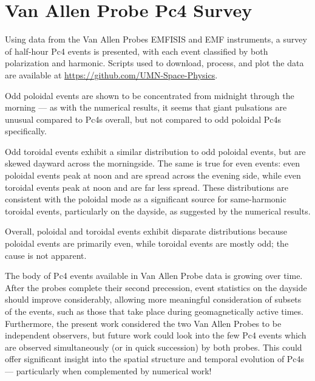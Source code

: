 



\section{Van Allen Probe Pc4 Survey}

Using data from the Van Allen Probes EMFISIS and EMF instruments, a survey of
 half-hour Pc4 events is presented, with each event classified by
both polarization
and harmonic. Scripts used to download, process, and plot the data are
available at \url{https://github.com/UMN-Space-Physics}. 

Odd poloidal events are shown to be concentrated from midnight through the
morning --- as with the numerical results, it seems that giant pulsations are
unusual compared to Pc4s overall, but not compared to odd poloidal Pc4s
specifically. 

Odd toroidal events exhibit a similar distribution to odd poloidal events, but
are skewed dayward across the morningside. The same is true for even events:
even poloidal events peak at noon and are spread across the evening side, while
even toroidal events peak at noon and are far less spread. These distributions
are consistent with the poloidal mode as a significant source for same-harmonic
toroidal events, particularly on the dayside, as suggested by the numerical
results. 

Overall, poloidal and toroidal events exhibit disparate distributions because
poloidal events are primarily even, while toroidal events are mostly odd; the
cause is not apparent. 

The body of Pc4 events available in Van Allen Probe data is growing over time.
After the probes complete their second precession, event statistics on the
dayside should improve considerably, allowing more meaningful consideration of
subsets of the events, such as those that take place during geomagnetically
active times. Furthermore, the present work considered the two Van Allen Probes
to be independent observers, but future work could look into the few Pc4 events
which are observed simultaneously (or in quick succession) by both probes. This
could offer significant insight into the spatial structure and temporal
evolution of Pc4s --- particularly when complemented by numerical work! 










